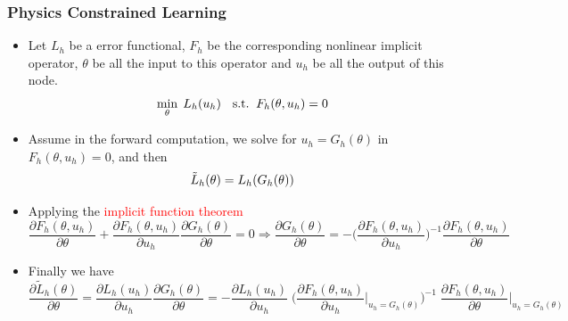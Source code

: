 \documentclass{beamer}
\begin{document}
\begin{frame}
	\frametitle{Physics Constrained Learning}
	\begin{itemize}
		\item Let $L_h$ be a error functional, $F_h$ be the corresponding nonlinear implicit operator, $\theta$ be all the input to this operator and $u_h$ be all the output of this node.
 $${\small    \min_{\theta}\; L_h(u_h) \quad \mathrm{s.t.}\;\; F_h(\theta, u_h) = 0}$$

\item Assume in the forward computation, we solve for $u_h=G_h(\theta)$ in $F_h(\theta, u_h)=0$, and then
$${\small\tilde L_h(\theta)  = L_h(G_h(\theta))}$$
\item Applying the \textcolor{red}{implicit function theorem}
{  \scriptsize
\begin{equation*}
\frac{{\partial {F_h(\theta, u_h)}}}{{\partial \theta }} + {\frac{{\partial {F_h(\theta, u_h)}}}{{\partial {u_h}}}}  \frac{\partial G_h(\theta)}{\partial \theta} = 0  \Rightarrow 
     \frac{\partial G_h(\theta)}{\partial \theta} =  -\Big( \frac{{\partial {F_h(\theta, u_h)}}}{{\partial {u_h}}} \Big)^{ - 1} \frac{{\partial {F_h(\theta, u_h)}}}{{\partial \theta }}
\end{equation*}
}
\item Finally we have
{\scriptsize
\begin{equation*}
    \boxed{\frac{{\partial {{\tilde L}_h}(\theta )}}{{\partial \theta }} 
    = \frac{\partial {{ L}_h}(u_h )}{\partial u_h}\frac{\partial G_h(\theta)}{\partial \theta}= - \frac{{\partial {L_h}({u_h})}}{{\partial {u_h}}} \;
    \Big( {\frac{{\partial {F_h(\theta, u_h)}}}{{\partial {u_h}}}\Big|_{u_h = {G_h}(\theta )}} \Big)^{ - 1} \;
    \frac{{\partial {F_h(\theta, u_h)}}}{{\partial \theta }}\Big|_{u_h = {G_h}(\theta )}}
\end{equation*}
}

	\end{itemize}
	
\end{frame}
\end{document}
